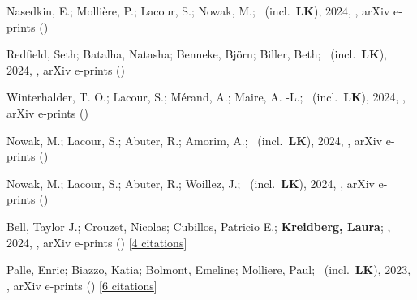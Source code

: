 \item[{\color{numcolor}\scriptsize22}] Nasedkin, E.; Molli{\`e}re, P.; Lacour, S.; Nowak, M.; \etal\ (incl.\ \textbf{LK}), 2024, , arXiv e-prints ()

\item[{\color{numcolor}\scriptsize21}] Redfield, Seth; Batalha, Natasha; Benneke, Bj{\"o}rn; Biller, Beth; \etal\ (incl.\ \textbf{LK}), 2024, , arXiv e-prints ()

\item[{\color{numcolor}\scriptsize20}] Winterhalder, T. O.; Lacour, S.; M{\'e}rand, A.; Maire, A. -L.; \etal\ (incl.\ \textbf{LK}), 2024, , arXiv e-prints ()

\item[{\color{numcolor}\scriptsize19}] Nowak, M.; Lacour, S.; Abuter, R.; Amorim, A.; \etal\ (incl.\ \textbf{LK}), 2024, , arXiv e-prints ()

\item[{\color{numcolor}\scriptsize18}] Nowak, M.; Lacour, S.; Abuter, R.; Woillez, J.; \etal\ (incl.\ \textbf{LK}), 2024, , arXiv e-prints ()

\item[{\color{numcolor}\scriptsize17}] Bell, Taylor J.; Crouzet, Nicolas; Cubillos, Patricio E.; \textbf{Kreidberg, Laura}; \etal, 2024, , arXiv e-prints () [\href{https://ui.adsabs.harvard.edu/abs/2024arXiv240113027B}{4 citations}]

\item[{\color{numcolor}\scriptsize16}] Palle, Enric; Biazzo, Katia; Bolmont, Emeline; Molliere, Paul; \etal\ (incl.\ \textbf{LK}), 2023, , arXiv e-prints () [\href{https://ui.adsabs.harvard.edu/abs/2023arXiv231117075P}{6 citations}]

